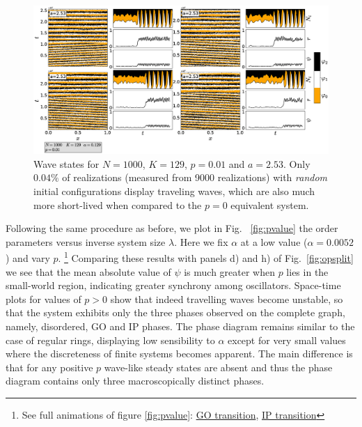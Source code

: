 \begin{figure}
\begin{center}
    \includegraphics[width=1.0\textwidth]{fig/chap2/rewiredwavetrial.eps}
\caption{\label{fig:trialpanel3} Wave states for $N=1000$, $K=129$, $p=0.01$ and $a=2.53$. Only $0.04\%$ of realizations (measured from
9000 realizations) with \textit{random} initial configurations display traveling waves, which are also much more short-lived when compared
to the $p=0$ equivalent system.}
\end{center}
\end{figure}

Following the same procedure as before, we plot in Fig.~ \ref{fig:pvalue} the order parameters versus inverse system size $\lambda$.
Here we fix $\alpha$ at a low value ($\alpha=0.0052$) and vary $p$.  \footnote{{See full animations of figure \ref{fig:pvalue}:
\href{https://youtu.be/3iHXrDUwbqs}{GO transition}},
\href{https://youtu.be/J9OHw3DycAQ}{IP transition}}
Comparing these results with panels d) and h) of Fig.~\ref{fig:opsplit} we see that the mean absolute value of $\psi$ is much greater
when $p$ lies in the small-world region, indicating greater synchrony among oscillators. Space-time plots for values of $p>0$ show that
indeed travelling waves become unstable, so that the system exhibits only the three phases observed on the complete graph, namely,
disordered, GO and IP phases. The phase diagram remains similar to the case of regular rings, displaying low sensibility to $\alpha$
except for very small values where the discreteness of finite systems becomes apparent. The main difference is that for any positive
$p$ wave-like steady states are absent and thus the phase diagram contains only three macroscopically distinct phases.

